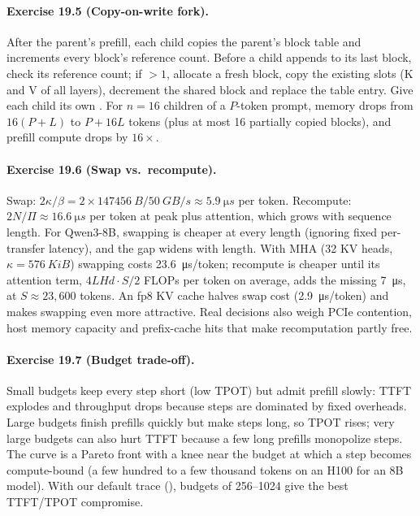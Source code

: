 \paragraph{Exercise 19.5 (Copy-on-write fork).}
After the parent's prefill, each child copies the parent's block table and increments every block's
reference count. Before a child appends to its last block, check its reference count; if $>1$, allocate a
fresh block, copy the existing slots (K and V of all layers), decrement the shared block and replace the
table entry. Give each child its own . For $n=16$ children of a $P$-token prompt,
memory drops from $16(P+L)$ to $P+16L$ tokens (plus at most 16 partially copied blocks), and prefill compute
drops by $16\times$.

\paragraph{Exercise 19.6 (Swap vs.\ recompute).}
Swap: $2\kappa/\beta=2\times\SI{147456}{B}/\SI{50}{GB/s}\approx\SI{5.9}{\micro s}$ per token. Recompute:
$2N/\Pi\approx\SI{16.6}{\micro s}$ per token at peak plus attention, which grows with sequence length.
For Qwen3-8B, swapping is cheaper at every length (ignoring fixed per-transfer latency), and the gap widens
with length. With MHA (32 KV heads, $\kappa=\SI{576}{KiB}$) swapping costs \SI{23.6}{\micro s}/token; recompute
is cheaper until its attention term, $4LHd\cdot S/2$ FLOPs per token on average, adds the missing
\SI{7}{\micro s}, at $S\approx23{,}600$ tokens. An fp8 KV cache halves swap cost (\SI{2.9}{\micro s}/token) and
makes swapping even more attractive. Real decisions also weigh PCIe contention, host memory capacity and
prefix-cache hits that make recomputation partly free.

\paragraph{Exercise 19.7 (Budget trade-off).}
Small budgets keep every step short (low TPOT) but admit prefill slowly: TTFT explodes and throughput drops
because steps are dominated by fixed overheads. Large budgets finish prefills quickly but make steps
long, so TPOT rises; very large budgets can also hurt TTFT because a few long prefills monopolize steps.
The curve is a Pareto front with a knee near the budget at which a step becomes compute-bound
(a few hundred to a few thousand tokens on an H100 for an 8B model). With our default trace
(), budgets of 256--1024 give the best TTFT/TPOT compromise.

